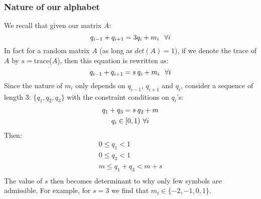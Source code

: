 \subsubsection{Nature of our alphabet}
We recall that given our matrix $A$:
\[
q_{i-1} + q_{i+1} = 3q_i + m_i  \hskip 0.1in  \forall i
\]
In fact for a random matrix $A$ (as long as $det(A) = 1$), if we denote the trace of $A$ by $s = $trace($A$), then this equation is rewritten as:
\[
q_{i-1} + q_{i+1} = s \: q_i + m_i  \hskip 0.1in  \forall i
\]
Since the nature of $m_i$ only depends on $q_{i-1}$, $q_{i+1}$ and $q_i$,
consider a sequence of length 3: $\{q_1, q_2, q_3\}$ with the constraint
conditions on $q_i$'s:
\[
\begin{array}{c}
q_1 + q_3 = s \: q_2 + m \\ [3pt]
q_i \in [0,1) \hskip 0.05in \forall i
\end{array}
\]
Then:
\[
\begin {array} {c}
0 \leqslant q_1 < 1 \\
0 \leqslant q_3 < 1 \\
m \leqslant q_1 + q_3 < m + s \\
\end {array}
\]
The value of $s$ then becomes determinant to why only few symbols are
admissible. For example, for $s = 3$ we find that $m_t \in \{-2, -1, 0, 1\}$.


